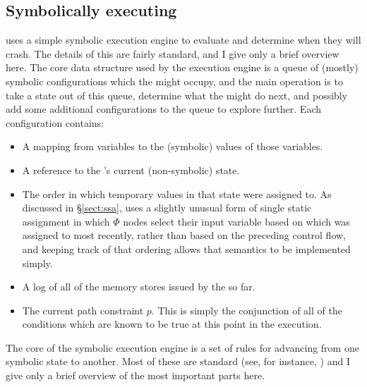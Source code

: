 \subsection{Symbolically executing {\StateMachines}}

{\Implementation} uses a simple symbolic execution engine to evaluate
{\StateMachines} and determine when they will crash.  The details of
this are fairly standard, and I give only a brief overview
here.  The core data structure
used by the execution engine is a queue of (mostly) symbolic
configurations which the {\StateMachine} might occupy, and the main
operation is to take a state out of this queue, determine what the
\StateMachine might do next, and possibly add some additional
configurations to the queue to explore further.  Each configuration
contains:

\begin{itemize}
\item
  A mapping from {\StateMachine} variables to the (symbolic) values of
  those variables.
\item
  A reference to the {\StateMachine}'s current (non-symbolic) state.
\item
  The order in which temporary values in that state were assigned to.
  As discussed in \S\ref{sect:ssa}, {\technique} uses a slightly
  unusual form of single static assignment in which $\Phi$ nodes
  select their input variable based on which was assigned to most
  recently, rather than based on the preceding control flow, and
  keeping track of that ordering allows that semantics to be
  implemented simply.
\item
  A log of all of the memory stores issued by the {\StateMachine} so
  far.
\item
  The current path constraint $p$.  This is simply the conjunction of
  all of the conditions which are known to be true at this point in
  the execution.
\end{itemize}

The core of the symbolic execution engine is a set of rules for
advancing from one symbolic state to another.  Most of these are
standard (see, for instance, ) and I give only a brief overview of the most important
parts here.

